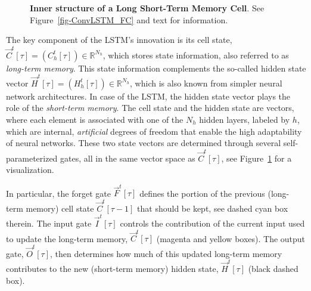 \documentclass[
]{agujournal2019}
\begin{document}
\begin{figure}


\caption{\label{fig-lstm}\textbf{Inner structure of a Long Short-Term
Memory Cell}. See Figure~\ref{fig-ConvLSTM_FC} and text for
information.}

\end{figure}%

The key component of the LSTM's innovation is its cell state,
\(\vec{C}^t[\tau] = (C^t_h[\tau]) \in \mathbb{R}^{N_h}\), which stores
state information, also referred to as \emph{long-term memory}. This
state information complements the so-called hidden state vector
\(\vec{H}^t[\tau] = (H^t_h[\tau]) \in \mathbb{R}^{N_h}\), which is also
known from simpler neural network architectures. In case of the LSTM,
the hidden state vector plays the role of the \emph{short-term memory}.
The cell state and the hidden state are vectors, where each element is
associated with one of the \(N_h\) hidden layers, labeled by \(h\),
which are internal, \emph{artificial} degrees of freedom that enable the
high adaptability of neural networks. These two state vectors are
determined through several self-parameterized gates, all in the same
vector space as \(\vec{C}^t[\tau]\), see Figure~\ref{fig-lstm} for a
visualization.

In particular, the forget gate \(\vec{F}^t[\tau]\) defines the portion
of the previous (long-term memory) cell state \(\vec{C}^t[\tau-1]\) that
should be kept, see dashed cyan box therein\hspace{0pt}. The input gate
\(\vec{I}^t[\tau]\) controls the contribution of the current input used
to update the long-term memory, \(\vec{C}^t[\tau]\) (magenta and yellow
boxes). The output gate, \(\vec{O}^t[\tau]\), then determines how much
of this updated long-term memory contributes to the new (short-term
memory) hidden state, \(\vec{H}^t[\tau]\) (black dashed box).
\end{document}
